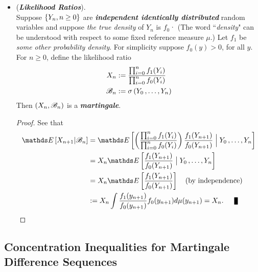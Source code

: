 \documentclass[11pt]{article}
\begin{document}
\begin{itemize}
\item \begin{example} (\emph{\textbf{Likelihood Ratios}}).\\ 
Suppose $\left\{Y_n, n \ge 0\right\}$ are \emph{\textbf{independent identically distributed}} random variables and suppose \emph{the true density} of $Y_n$ is $f_0$· (The word ``\emph{density}" can be understood with respect to some fixed reference measure $\mu$.)  Let $f_1$ be \emph{some other probability density}. For simplicity suppose $f_0(y) > 0$, for all $y$.  For $n \ge 0$, define the likelihood ratio
\begin{align*}
X_n &:= \frac{\prod_{i=0}^{n}f_1(Y_i)}{\prod_{i=0}^{n}f_0(Y_i)}\\
{\mathscr B}_n &:= \sigma\left(Y_0 \,{,}\ldots{,}\, Y_n\right)
\end{align*} Then $(X_n, {\mathscr B}_n)$ is a \emph{\textbf{martingale}}.
\end{example}
\begin{proof}
See that
\begin{align*}
\E{}{X_{n+1} | \srB_n} &= \E{}{ \paren{\frac{\prod_{i=0}^{n}f_1(Y_i)}{\prod_{i=0}^{n}f_0(Y_i)}}\frac{f_1(Y_{n+1})}{f_0(Y_{n+1})} \;  \Big| \; Y_0 \xdotx{,} Y_{n}}\\
&= X_n \E{}{\frac{f_1(Y_{n+1})}{f_0(Y_{n+1})} \;  \big| \; Y_0 \xdotx{,} Y_{n}} \\
&= X_n \E{}{\frac{f_1(Y_{n+1})}{f_0(Y_{n+1})}} \quad (\text{by independence})\\
&:= X_n \int \frac{f_1(y_{n+1})}{f_0(y_{n+1})} f_0(y_{n+1}) d\mu(y_{n+1}) = X_n. \qed
\end{align*}
\end{proof}
\end{itemize}

\subsection{Concentration Inequalities for Martingale Difference Sequences}
\end{document}
